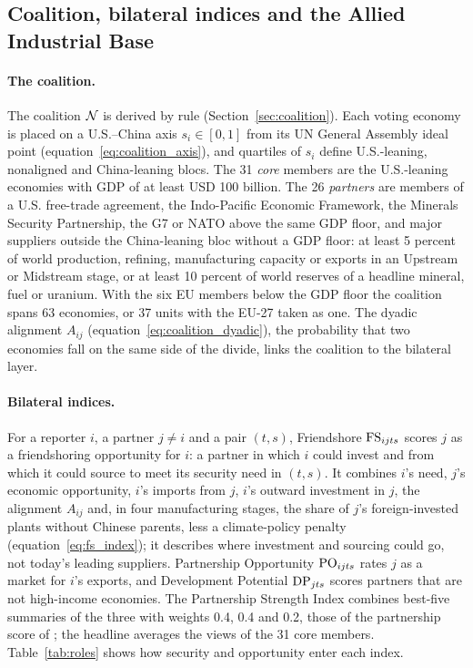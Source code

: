 \subsection{Coalition, bilateral indices and the Allied Industrial Base}\label{subsec:framework_layers}

\paragraph{The coalition.} The coalition $\mathcal{N}$ is derived by rule
(Section~\ref{sec:coalition}). Each voting economy is placed on a U.S.--China axis
$s_i\in[0,1]$ from its UN General Assembly ideal point (equation~\eqref{eq:coalition_axis}), and
quartiles of $s_i$ define U.S.-leaning, nonaligned and China-leaning blocs. The 31 \emph{core}
members are the U.S.-leaning economies with GDP of at least USD 100 billion. The 26
\emph{partners} are members of a U.S. free-trade agreement, the Indo-Pacific Economic Framework,
the Minerals Security Partnership, the G7 or NATO above the same GDP floor, and major suppliers
outside the China-leaning bloc without a GDP floor: at least 5 percent of world production,
refining, manufacturing capacity or exports in an Upstream or Midstream stage, or at least 10
percent of world reserves of a headline mineral, fuel or uranium. With the six EU members below
the GDP floor the coalition spans 63 economies, or 37 units with the EU-27 taken as one. The dyadic alignment $A_{ij}$
(equation~\eqref{eq:coalition_dyadic}), the probability that two economies fall on the same side
of the divide, links the coalition to the bilateral layer.

\paragraph{Bilateral indices.} For a reporter $i$, a partner $j\neq i$ and a pair $(t,s)$,
Friendshore $\mathrm{FS}_{ijts}$ scores $j$ as a friendshoring opportunity for $i$: a partner in which $i$
could invest and from which it could source to meet its security need in $(t,s)$. It combines
$i$'s need, $j$'s economic opportunity, $i$'s imports from $j$, $i$'s outward investment in $j$, the
alignment $A_{ij}$ and, in four manufacturing stages, the share of $j$'s foreign-invested plants
without Chinese parents, less a climate-policy penalty (equation~\eqref{eq:fs_index}); it describes
where investment and sourcing could go, not today's leading suppliers. Partnership Opportunity $\mathrm{PO}_{ijts}$ rates
$j$ as a market for $i$'s exports, and Development Potential $\mathrm{DP}_{jts}$ scores partners that are
not high-income economies. The Partnership Strength Index combines best-five summaries of the
three with weights 0.4, 0.4 and 0.2, those of the partnership score of \citet{carey2025secure};
the headline averages the views of the 31 core members. Table~\ref{tab:roles} shows how security
and opportunity enter each index.

